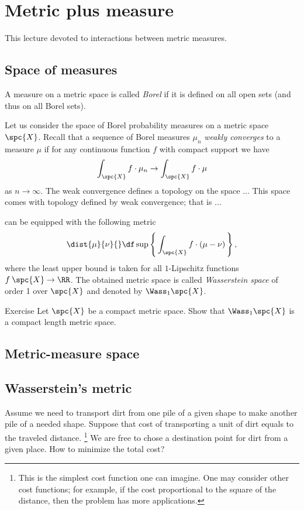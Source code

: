 \chapter{Metric plus measure}

This lecture devoted to interactions between metric measures.

\section{Space of measures}

A measure on a metric space is called \emph{Borel} if it is defined on all open sets (and thus on all Borel sets).

Let us consider the space of Borel probability measures on a metric space $\spc{X}$.
Recall that a sequence of Borel measures $\mu_n$ \emph{weakly converges} to a measure $\mu$ if for any continuous function $f$ with compact support we have
\[\int_{\spc{X}} f\cdot \mu_n\to\int_{\spc{X}} f\cdot \mu\]
as $n\to \infty$.
The weak convergence defines a topology on the space ...
This space comes with topology defined by weak convergence;
that is ...

can be equipped with the following metric 
\[\dist{\mu}{\nu}{}\df\sup\left\{\,\int_{\spc{X}} f\cdot(\mu-\nu)\,\right\},\]
where the least upper bound is taken for all $1$-Lipschitz functions $f\:\spc{X}\to\RR$.
The obtained metric space is called \emph{Wasserstein space} of order 1 over $\spc{X}$ and denoted by $\Wass_1\spc{X}$.

\begin{thm}{Exercise}\label{ex:wasserstein}
Let $\spc{X}$ be a compact metric space.
Show that $\Wass_1\spc{X}$ is a compact length metric space.
\end{thm}

\section{Metric-measure space}

\section{Wasserstein's metric}

Assume we need to transport dirt from one pile of a given shape to make another pile of a needed shape.
Suppose that cost of transporting a unit of dirt equals to the traveled distance.%
\footnote{This is the simplest cost function one can imagine.
One may consider other cost functions; for example, if the cost proportional to the square of the distance, then the problem has more applications.}
We are free to chose a destination point for dirt from a given place.
How to minimize the total cost?

